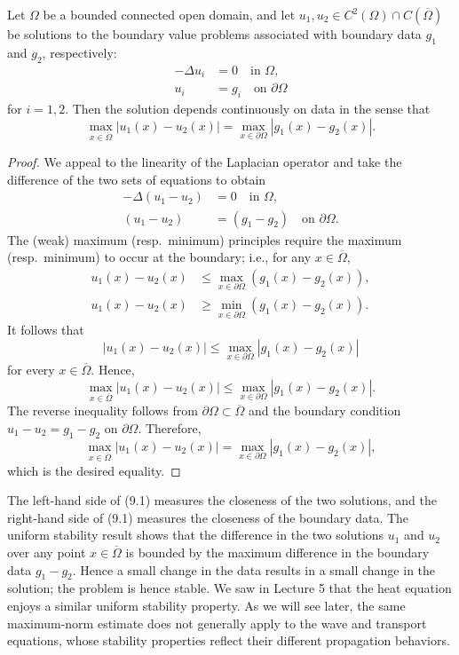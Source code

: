 \begin{theorem}
    Let $\Omega$ be a bounded connected open domain, and let $u_1, u_2 \in C^2(\Omega) \cap C(\overline{\Omega})$ be solutions to the boundary value problems associated with boundary data $g_1$ and $g_2$, respectively:
    \begin{align*}
        -\Delta u_i &= 0 \quad \text{in } \Omega, \\
        u_i &= g_i \quad \text{on } \partial\Omega
    \end{align*}
    for $i = 1, 2$. Then the solution depends continuously on data in the sense that
    \begin{equation*}
        \max_{x \in \overline{\Omega}} |u_1(x) - u_2(x)| = \max_{x \in \partial\Omega} |g_1(x) - g_2(x)|. \tag{9.1}
    \end{equation*}
\end{theorem}
\begin{proof}
    We appeal to the linearity of the Laplacian operator and take the difference of the two sets of equations to obtain
    \begin{align*}
        -\Delta(u_1 - u_2) &= 0 \quad \text{in } \Omega, \\
        (u_1 - u_2) &= (g_1 - g_2) \quad \text{on } \partial\Omega.
    \end{align*}
    The (weak) maximum (resp.\ minimum) principles require the maximum (resp.\ minimum) to occur at the boundary; i.e., for any $x \in \overline{\Omega}$,
    \begin{align*}
        u_1(x) - u_2(x) &\leq \max_{x \in \partial\Omega} (g_1(x) - g_2(x)), \\
        u_1(x) - u_2(x) &\geq \min_{x \in \partial\Omega} (g_1(x) - g_2(x)).
    \end{align*}
    It follows that
    \[|u_1(x) - u_2(x)| \leq \max_{x \in \partial\Omega} |g_1(x) - g_2(x)|\]
    for every $x \in \overline{\Omega}$. Hence,
    \[\max_{x \in \overline{\Omega}} |u_1(x) - u_2(x)| \leq \max_{x \in \partial\Omega} |g_1(x) - g_2(x)|.\]
    The reverse inequality follows from $\partial\Omega \subset \overline{\Omega}$ and the boundary condition $u_1 - u_2 = g_1 - g_2$ on $\partial\Omega$. Therefore,
    \[\max_{x \in \overline{\Omega}} |u_1(x) - u_2(x)| = \max_{x \in \partial\Omega} |g_1(x) - g_2(x)|,\]
    which is the desired equality.
\end{proof}

The left-hand side of (9.1) measures the closeness of the two solutions, and the right-hand side of (9.1) measures the closeness of the boundary data. The uniform stability result shows that the difference in the two solutions $u_1$ and $u_2$ over any point $x \in \overline{\Omega}$ is bounded by the maximum difference in the boundary data $g_1 - g_2$. Hence a small change in the data results in a small change in the solution; the problem is hence stable. We saw in Lecture 5 that the heat equation enjoys a similar uniform stability property. As we will see later, the same maximum-norm estimate does not generally apply to the wave and transport equations, whose stability properties reflect their different propagation behaviors.

